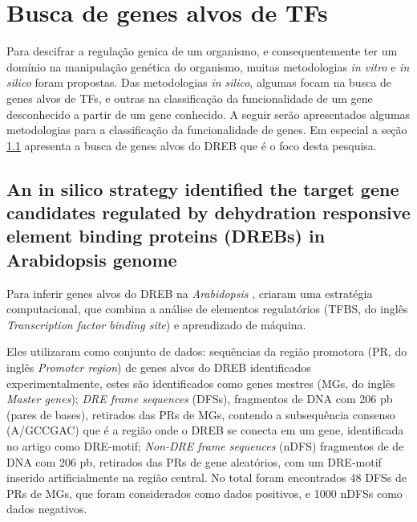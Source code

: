 \chapter{Busca de genes alvos de TFs}

Para descifrar a regulação genica de um organismo, e consequentemente ter um domínio na manipulação genética do organismo, muitas metodologias \textit{in vitro} e \textit{in silico} foram propostas. Das metodologias \textit{in silico}, algumas focam na busca de genes alvos de TFs, e outras na classificação da funcionalidade de um gene desconhecido a partir de um gene conhecido. A seguir serão apresentados algumas metodologias para a classificação da funcionalidade de genes. Em especial a seção \ref{dreb} apresenta a busca de genes alvos do DREB que é o foco desta pesquisa.

 





\section{An in silico strategy identified the target gene candidates regulated by dehydration responsive element binding proteins (DREBs) in Arabidopsis genome \cite{Wang2009}} \label{dreb}
Para inferir genes alvos do DREB na \textit{Arabidopsis} \cite{Wang2009}, criaram uma estratégia computacional, que combina a análise de elementos regulatórios (TFBS, do inglês \textit{Transcription factor binding site}) e aprendizado de máquina.

Eles utilizaram como conjunto de dados: sequências da região promotora (PR, do inglês \textit{Promoter region}) de genes alvos do DREB identificados experimentalmente, estes são identificados como genes mestres (MGs, do inglês \textit{Master genes}); \textit{DRE frame sequences} (DFSs), fragmentos de DNA com 206 pb (pares de bases), retirados das PRs de MGs, contendo a subsequência consenso (A/GCCGAC) que é a região onde o DREB se conecta em um gene, identificada no artigo como DRE-motif; \textit{Non-DRE frame sequences} (nDFS) fragmentos de de DNA com 206 pb, retirados das PRs de gene aleatórios, com um DRE-motif inserido artificialmente na região central. No total foram encontrados 48 DFSs de PRs de MGs, que foram considerados como dados positivos, e 1000 nDFSs como dados negativos.

